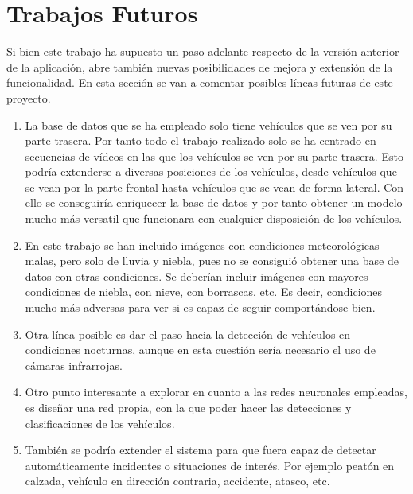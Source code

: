 \section{Trabajos Futuros}

Si bien este trabajo ha supuesto un paso adelante respecto de la versión anterior de la aplicación, abre también nuevas posibilidades de mejora y extensión de la funcionalidad. En esta sección se van a comentar posibles líneas futuras de este proyecto.

\begin{enumerate}
    \item La base de datos que se ha empleado solo tiene vehículos que se ven por su parte trasera. Por tanto todo el trabajo realizado solo se ha centrado en secuencias de vídeos en las que los vehículos se ven por su parte trasera. Esto podría extenderse a diversas posiciones de los vehículos, desde vehículos que se vean por la parte frontal hasta vehículos que se vean de forma lateral. Con ello se conseguiría enriquecer la base de  datos y por tanto obtener un modelo mucho más versatil que funcionara con cualquier disposición de los vehículos.
    \item En este trabajo se han incluido imágenes con condiciones meteorológicas malas, pero solo de lluvia y niebla, pues no se consiguió obtener una base de datos con otras condiciones. Se deberían incluir imágenes con mayores condiciones de niebla, con nieve, con borrascas, etc. Es decir, condiciones mucho más adversas para ver si es capaz de seguir comportándose bien.
    \item Otra línea posible es dar el paso hacia la detección de vehículos en condiciones nocturnas, aunque en esta cuestión sería necesario el uso de cámaras infrarrojas.
    \item Otro punto interesante a explorar en cuanto a las redes neuronales empleadas, es diseñar una red propia, con la que poder hacer las detecciones y clasificaciones de los vehículos.
    \item También se podría extender el sistema para que fuera capaz de detectar automáticamente incidentes o situaciones de interés. Por ejemplo peatón en calzada, vehículo en dirección contraria, accidente, atasco, etc.
\end{enumerate}{}
